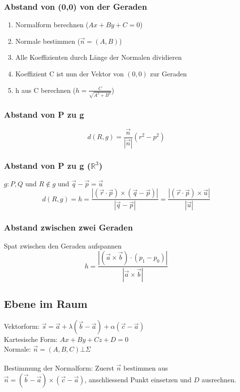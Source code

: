 \documentclass{report}
\begin{document}
\subsubsection{Abstand von (0,0) von der Geraden}
\begin{enumerate}
\item Normalform berechnen ($Ax + By + C = 0$)
\item Normale bestimmen ($\vec{n} = (A, B)$)
\item Alle Koeffizienten durch Länge der Normalen dividieren
\item Koeffizient C ist nun der Vektor von $(0,0)$ zur Geraden
\item h aus C berechnen ($h =\frac{C}{\sqrt{A^2+B^2}}$)\end{enumerate}
\subsubsection{Abstand von P zu g}
\begin{equation}d(R,g) = \frac{\vec{n}}{|\vec{n}|}(r^2 - p^2)\end{equation}
\subsubsection{Abstand von P zu g ($\mathbb{R}^3$)}
$g: P, Q$ und $R \notin g$ und $\vec{q} - \vec{p} = \vec{u}$\\
\begin{equation}d(R,g) = h = \frac{|(\vec{r} \cdot \vec{p}) \times (\vec{q} - \vec{p})|}{|\vec{q} - \vec{p}|} = \frac{|(\vec{r} \cdot \vec{p}) \times \vec{u}|}{|\vec{u}|}\end{equation}
\subsubsection{Abstand zwischen zwei Geraden}
Spat zwischen den Geraden aufspannen
\begin{equation}h = \frac{|(\vec{a} \times \vec{b}) \cdot (p_1 - p_0)|}{|\vec{a} \times \vec{b}|}\end{equation}
\subsection{Ebene im Raum}
Vektorform: $\vec{s} = \vec{a} + \lambda (\vec{b} - \vec{a}) + \alpha (\vec{c} - \vec{a})$\\
Kartesische Form: $Ax+By+Cz+D=0$\\
Normale: $\vec{n} = (A, B, C) \bot \Sigma$\\\\
Bestimmung der Normalform: Zuerst $\vec{n}$ bestimmen aus $\vec{n} = (\vec{b} - \vec{a}) \times (\vec{c} - \vec{a})$, anschliessend Punkt einsetzen und $D$ ausrechnen.
\end{document}
